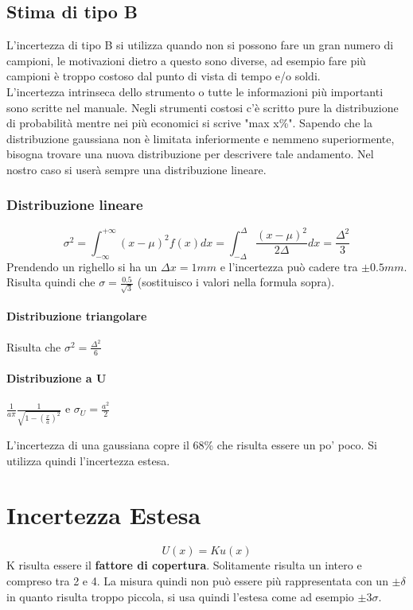 \subsection{Stima di tipo B}
L'incertezza di tipo B si utilizza quando non si possono fare un gran numero di campioni, le motivazioni dietro a questo sono diverse, ad esempio fare più campioni è troppo costoso dal punto di vista di tempo e/o soldi.\\
L'incertezza intrinseca dello strumento o tutte le informazioni più importanti sono scritte nel manuale. Negli strumenti costosi c'è scritto pure la distribuzione di probabilità mentre nei più economici si scrive "max x\%". Sapendo che la distribuzione gaussiana non è limitata inferiormente e nemmeno superiormente, bisogna trovare una nuova distribuzione per descrivere tale andamento. Nel nostro caso si userà sempre una distribuzione lineare.
\subsubsection{Distribuzione lineare}
    \[
        \sigma^2 = \int_{-\infty}^{+\infty}(x-\mu)^2f(x)dx = \int_{-\Delta}^\Delta \frac{(x-\mu)^2}{2\Delta}dx = \frac{\Delta^2}{3}
    \]
    Prendendo un righello si ha un $\Delta x = 1mm$ e l'incertezza può cadere tra $\pm 0.5mm$. Risulta quindi che $\sigma = \frac{0.5}{\sqrt{3}}$ (sostituisco i valori nella formula sopra).
\paragraph{Distribuzione triangolare}
    Risulta che $\sigma^2 = \frac{\Delta ^2}{6}$
\paragraph{Distribuzione a U}
$\frac{1}{a\pi}\frac{1}{\sqrt{1-(\frac{x}{a})^2}}$ e $\sigma_U = \frac{a^2}{2}$

L'incertezza di una gaussiana copre il 68\% che risulta essere un po' poco. Si utilizza quindi l'incertezza estesa.

\section{Incertezza Estesa}
\[
    U(x) = K u(x)
\] K risulta essere il \textbf{fattore di copertura}. Solitamente risulta un intero e compreso tra 2 e 4. La misura quindi non può essere più rappresentata con un $\pm \delta$ in quanto risulta troppo piccola, si usa quindi l'estesa come ad esempio $\pm 3\sigma$.

